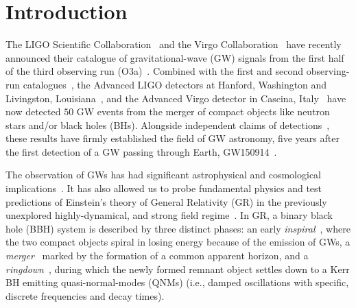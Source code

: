 \documentclass[twocolumn,prd,aps,superscriptaddress,preprintnumbers,tightenlines,showpacs,nofootinbib,eqsecnum,amsfonts,amsmath]{revtex4-1}
\begin{document}
\maketitle

\section{Introduction}
\label{sec:intro}
The LIGO Scientific Collaboration~\cite{lsc} and the Virgo
Collaboration~\cite{Virgo} have recently announced their catalogue of
gravitational-wave (GW) signals from the first
half of the third observing run (O3a)~\cite{Abbott:2020niy}. Combined
with the first and second observing-run catalogues~\cite{LIGOScientific:2018mvr}, the Advanced LIGO detectors at Hanford,
Washington and Livingston, Louisiana~\cite{TheLIGOScientific:2014jea},
and the Advanced Virgo detector in Cascina,
Italy~\cite{TheVirgo:2014hva} have now detected $50$ GW
events from the merger of compact objects like neutron stars and/or
black holes (BHs). Alongside independent claims of
detections~\cite{Nitz:2018imz,Nitz:2019hdf,Venumadhav:2019lyq,Zackay:2019btq}, these results have firmly established the field of GW astronomy, five years after the first detection of a GW passing through Earth, GW150914~\cite{Abbott:2016blz}.

The observation of GWs has had significant astrophysical and cosmological
implications~\cite{TheLIGOScientific:2016htt,GBM:2017lvd,Monitor:2017mdv,Abbott:2017xzu}. It
has also allowed us to probe fundamental
physics and test predictions of Einstein's theory of General Relativity
(GR) in the previously unexplored highly-dynamical, and strong field
regime~\cite{TheLIGOScientific:2016src,Abbott:2018lct,LIGOScientific:2019fpa,Abbott:2020jks}. In GR, a binary black hole (BBH) system is described by
three distinct phases: an early \textit{inspiral}~\cite{Blanchet:2013haa}, where the two
compact objects spiral in losing energy because of the emission of GWs, a \textit{merger}~\cite{Pretorius:2005gq,Campanelli:2005dd,Baker:2005vv} marked by the
formation of a common apparent horizon, and a \textit{ringdown}~\cite{Vishveshwara:1970zz,Vishveshwara:1970cc,Press:1971wr,Chandrasekhar:1975zza,Detweiler:1980gk}, during which the newly formed remnant object settles down to a Kerr BH emitting quasi-normal-modes (QNMs) (i.e., damped oscillations with specific, discrete frequencies and decay times).
\end{document}
